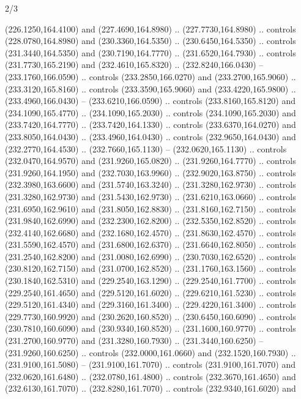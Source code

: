 \begin{flagdescription}{2/3}
\begin{scope}[xshift=0.5\flaglength,yshift=0.5\flagwidth,scale=\flagwidth/259.2]
\begin{scope}[y=0.8pt, x=0.8pt, yscale=-1,shift={(-243,-162)}]
      (226.1250,164.4100) and (227.4690,164.8980) .. (227.7730,164.8980) .. controls
      (228.0780,164.8980) and (230.3360,164.5350) .. (230.6450,164.5350) .. controls
      (231.3440,164.5350) and (230.7190,164.7770) .. (231.6520,164.7930) .. controls
      (231.7730,165.2190) and (232.4610,165.8320) .. (232.8240,166.0430) --
      (233.1760,166.0590) .. controls (233.2850,166.0270) and (233.2700,165.9060) ..
      (233.3120,165.8160) .. controls (233.3590,165.9060) and (233.4220,165.9800) ..
      (233.4960,166.0430) -- (233.6210,166.0590) .. controls (233.8160,165.8120) and
      (234.1090,165.4770) .. (234.1090,165.2030) .. controls (234.1090,165.2030) and
      (233.7420,164.7770) .. (233.7420,164.1330) .. controls (233.6370,164.0270) and
      (233.8050,164.0430) .. (233.4960,164.0430) .. controls (232.9650,164.0430) and
      (232.2770,164.4530) .. (232.7660,165.1130) -- (232.0620,165.1130) .. controls
      (232.0470,164.9570) and (231.9260,165.0820) .. (231.9260,164.7770) .. controls
      (231.9260,164.1950) and (232.7030,163.9960) .. (232.9020,163.8750) .. controls
      (232.3980,163.6600) and (231.5740,163.3240) .. (231.3280,162.9730) .. controls
      (231.3280,162.9730) and (231.5430,162.9730) .. (231.6210,163.0660) .. controls
      (231.6950,162.9610) and (231.8050,162.8830) .. (231.8160,162.7150) .. controls
      (231.9840,162.6990) and (232.2300,162.8200) .. (232.5350,162.8520) .. controls
      (232.4140,162.6680) and (232.1680,162.4570) .. (231.8630,162.4570) .. controls
      (231.5590,162.4570) and (231.6800,162.6370) .. (231.6640,162.8050) .. controls
      (231.2540,162.8200) and (231.0080,162.6990) .. (230.7030,162.6520) .. controls
      (230.8120,162.7150) and (231.0700,162.8520) .. (231.1760,163.1560) .. controls
      (230.1840,162.5310) and (229.2540,163.1290) .. (229.2540,161.7700) .. controls
      (229.2540,161.4650) and (229.5120,161.6020) .. (229.6210,161.5230) .. controls
      (229.5120,161.4340) and (229.3160,161.3400) .. (229.4220,161.3400) .. controls
      (229.7730,160.9920) and (230.2620,160.8520) .. (230.6450,160.6090) .. controls
      (230.7810,160.6090) and (230.9340,160.8520) .. (231.1600,160.9770) .. controls
      (231.2700,160.9770) and (231.3280,160.7930) .. (231.3440,160.6250) --
      (231.9260,160.6250) .. controls (232.0000,161.0660) and (232.1520,160.7930) ..
      (231.9100,161.5080) -- (231.9100,161.7070) .. controls (231.9100,161.7070) and
      (232.0620,161.6480) .. (232.0780,161.4800) .. controls (232.3670,161.4650) and
      (232.6130,161.7070) .. (232.8280,161.7070) .. controls (232.9340,161.6020) and

\end{scope}
\end{scope}
\end{flagdescription}
